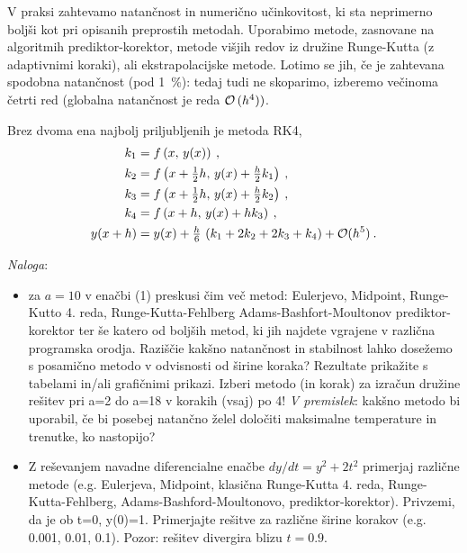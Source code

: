 \documentclass[12pt]{article}
\begin{document}
V praksi zahtevamo natančnost in numerično učinkovitost,
ki sta neprimerno boljši kot pri opisanih preprostih metodah.
Uporabimo metode, zasnovane na algoritmih prediktor-korektor,
metode višjih redov iz družine Runge-Kutta (z adaptivnimi koraki), ali ekstrapolacijske metode.
Lotimo se jih, če je zahtevana spodobna natančnost (pod 1~\%):
tedaj tudi ne skoparimo, izberemo večinoma četrti red (globalna natančnost je reda ${\cal O}\,(h^4))$.

\medskip
Brez dvoma ena najbolj priljubljenih je metoda RK4,
\begin{align}
k_1 & =
  f\left(x,\,{y}(x)\right) \> {,}\nonumber\\
k_2 & =
  f\left(x+{\textstyle{1\over 2}}h,\,
       {y}(x)+{\textstyle{h\over 2}}k_1\right) \> {,}\nonumber\\
k_3 & =
  f\left(x+{\textstyle{1\over 2}}h,\,
       {y}(x)+{\textstyle{h\over 2}}k_2\right) \> {,}\label{eq:rk4}\\
k_4 & =  f\left(x+h,\,{y}(x)+hk_3\right) \> {,}\nonumber\\
{y}(x+h) & =  {y}(x)
  + {\tfrac{h}{6}}\,\left(k_1 + 2k_2 + 2k_3 + k_4\right) + {\cal O}(h^5)
  \nonumber\> {.}
\end{align}

\bigskip


\noindent
{\it Naloga\/}:
\begin{itemize}
\item za $a = 10$ v enačbi (1) preskusi čim več metod: Eulerjevo, Midpoint, Runge-Kutto 4. reda, Runge-Kutta-Fehlberg  Adams-Bashfort-Moultonov prediktor-korektor ter še katero od boljših metod, ki jih najdete vgrajene v različna programska orodja. Raziščie kakšno natančnost in stabilnost lahko dosežemo s posamično metodo v odvisnosti od širine koraka? Rezultate prikažite s tabelami in/ali grafičnimi prikazi. Izberi metodo (in korak) za izračun družine rešitev pri a=2 do a=18 v korakih (vsaj) po 4! {\it V premislek\/}: kakšno metodo bi uporabil, če bi posebej natančno želel določiti maksimalne temperature in trenutke, ko nastopijo?
\item Z reševanjem navadne diferencialne enačbe $dy/dt=y^2+2t^2$ primerjaj različne metode (e.g. Eulerjeva, Midpoint, klasična Runge-Kutta 4. reda, Runge-Kutta-Fehlberg, Adams-Bashford-Moultonovo, prediktor-korektor).  Privzemi, da je ob t=0, y(0)=1. Primerjajte rešitve za različne širine korakov (e.g. 0.001, 0.01, 0.1). Pozor: rešitev divergira blizu $t = 0.9$.
\end{itemize}


\clearpage
\end{document}
